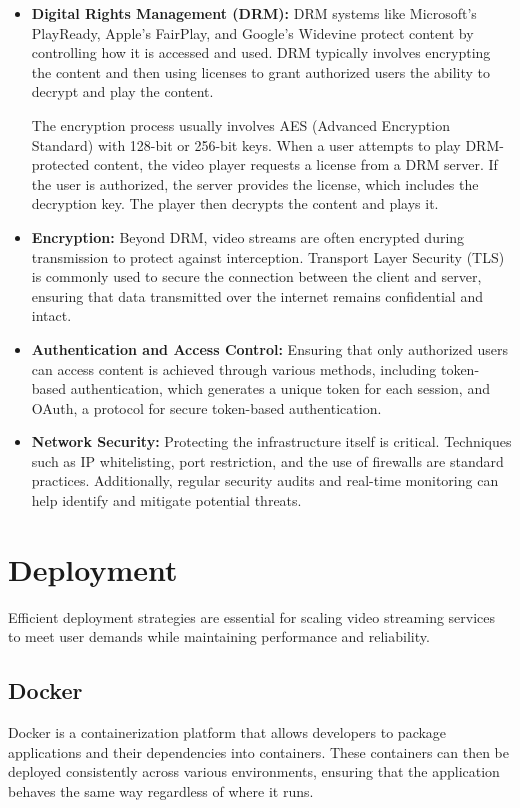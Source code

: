 \begin{itemize}
    \item \textbf{Digital Rights Management (DRM):} DRM systems like Microsoft's PlayReady, Apple's FairPlay, and Google's Widevine protect content by controlling how it is accessed and used. DRM typically involves encrypting the content and then using licenses to grant authorized users the ability to decrypt and play the content\cite{drm_video}.
    
    The encryption process usually involves AES (Advanced Encryption Standard) with 128-bit or 256-bit keys. When a user attempts to play DRM-protected content, the video player requests a license from a DRM server. If the user is authorized, the server provides the license, which includes the decryption key. The player then decrypts the content and plays it\cite{aes_drm}.
    
    \item \textbf{Encryption:} Beyond DRM, video streams are often encrypted during transmission to protect against interception. Transport Layer Security (TLS) is commonly used to secure the connection between the client and server, ensuring that data transmitted over the internet remains confidential and intact\cite{tls_video}.
    
    \item \textbf{Authentication and Access Control:} Ensuring that only authorized users can access content is achieved through various methods, including token-based authentication, which generates a unique token for each session, and OAuth, a protocol for secure token-based authentication\cite{auth_video}.
    
    \item \textbf{Network Security:} Protecting the infrastructure itself is critical. Techniques such as IP whitelisting, port restriction, and the use of firewalls are standard practices. Additionally, regular security audits and real-time monitoring can help identify and mitigate potential threats\cite{network_security}.
\end{itemize}

\section{Deployment}
Efficient deployment strategies are essential for scaling video streaming services to meet user demands while maintaining performance and reliability.

\subsection{Docker}
Docker is a containerization platform that allows developers to package applications and their dependencies into containers. These containers can then be deployed consistently across various environments, ensuring that the application behaves the same way regardless of where it runs.

